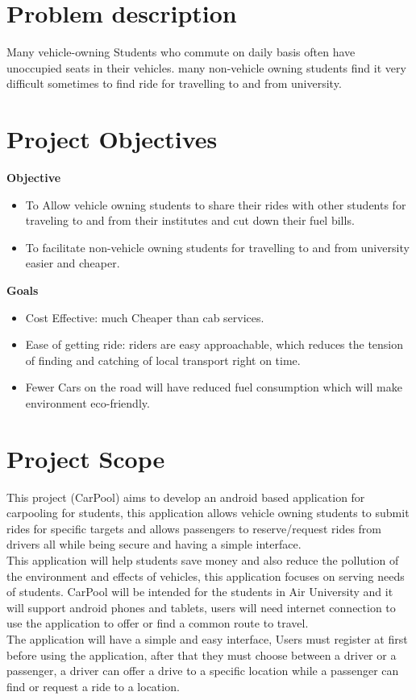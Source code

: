 \section{Problem description}
Many vehicle-owning Students who commute on daily basis often have unoccupied seats in their vehicles. many non-vehicle owning students find it very difficult sometimes to find ride for travelling to and from university.

\section{Project Objectives}
\textbf{Objective}
\begin{itemize}

\item To Allow vehicle owning students to share their rides with other students for traveling to and from their institutes and cut down their fuel bills.

\item To facilitate non-vehicle owning students for travelling to and from university easier and cheaper.

\end{itemize}
\textbf{Goals}
\begin{itemize}

\item Cost Effective: much Cheaper than cab services.
\item Ease of getting ride: riders are easy approachable, which reduces the tension of finding and catching of local transport right on time.
\item Fewer Cars on the road will have reduced fuel consumption which will make environment eco-friendly.
\end{itemize}

\section{Project Scope}
This project (CarPool) aims to develop an android based application for carpooling for students, this application allows vehicle owning students to submit rides for specific targets and allows passengers to reserve/request rides from drivers all while being secure and having a simple interface.
\\ This application will help students save money and also reduce the pollution of the environment and effects of vehicles, this application focuses on serving needs of students. CarPool will be intended for the students in Air University and it will support android phones and tablets, users will need internet connection to use the application to offer or find a common route to travel.
\\ The application will have a simple and easy interface, Users must register at first before using the application, after that they must choose between a driver or a passenger, a driver can offer a drive to a specific location while a passenger can find or request a ride to a location.

